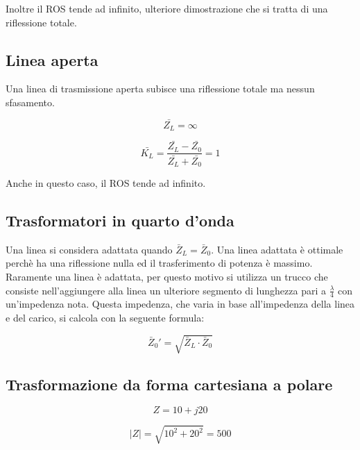 \documentclass{article}
\begin{document}
    Inoltre il ROS tende ad infinito, ulteriore dimostrazione che si tratta di una riflessione totale.

    \subsection{Linea aperta}

    Una linea di trasmissione aperta subisce una riflessione totale ma nessun sfasamento.

    \begin{equation}
        \bar{Z_L} = \infty
    \end{equation}

    \begin{equation}
        \bar{K_L} = \frac{
            \bar{Z_L} - \bar{Z_0}
        }{
            \bar{Z_L} + \bar{Z_0}
        } = 1
    \end{equation}

    Anche in questo caso, il ROS tende ad infinito.

    \subsection{Trasformatori in quarto d'onda}

    Una linea si considera adattata quando $\bar{Z}_L = \bar{Z}_0$. Una linea adattata è ottimale perchè ha una riflessione
    nulla ed il trasferimento di potenza è massimo. Raramente una linea è adattata, per questo motivo si utilizza un trucco
    che consiste nell'aggiungere alla linea un ulteriore segmento di lunghezza pari a $\frac{\lambda}{4}$ con un'impedenza
    nota. Questa impedenza, che varia in base all'impedenza della linea e del carico, si calcola con la seguente formula:

    \begin{equation}
        \bar{Z}_0' = \sqrt{\bar{Z}_L \cdot \bar{Z}_0}
    \end{equation}
    
    \subsection{Trasformazione da forma cartesiana a polare}

    \begin{equation}
        Z = 10 + j20
    \end{equation}

    \begin{equation}
        |Z| = \sqrt{10^2 + 20^2} = 500
    \end{equation}
\end{document}
